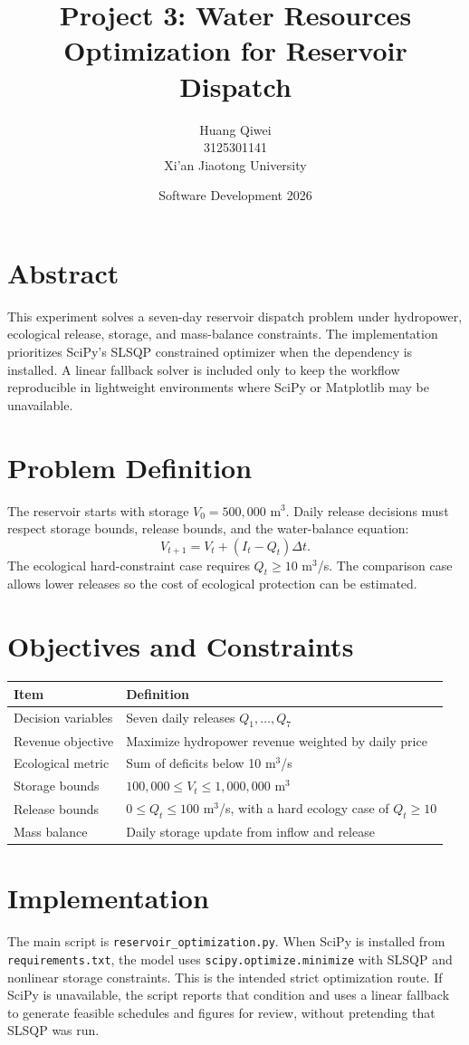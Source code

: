 \documentclass[11pt]{article}
\title{Project 3: Water Resources Optimization for Reservoir Dispatch}
\author{Huang Qiwei \\ 3125301141 \\ Xi'an Jiaotong University}
\date{Software Development 2026}
\begin{document}
\maketitle

\section*{Abstract}
This experiment solves a seven-day reservoir dispatch problem under hydropower, ecological release, storage, and mass-balance constraints. The implementation prioritizes SciPy's SLSQP constrained optimizer when the dependency is installed. A linear fallback solver is included only to keep the workflow reproducible in lightweight environments where SciPy or Matplotlib may be unavailable.

\section*{Problem Definition}
The reservoir starts with storage $V_0=500{,}000$ m$^3$. Daily release decisions must respect storage bounds, release bounds, and the water-balance equation:
\[
V_{t+1}=V_t+(I_t-Q_t)\Delta t.
\]
The ecological hard-constraint case requires $Q_t \ge 10$ m$^3$/s. The comparison case allows lower releases so the cost of ecological protection can be estimated.

\section*{Objectives and Constraints}
\begin{longtable}{ll}
\toprule
Item & Definition \\
\midrule
Decision variables & Seven daily releases $Q_1,\ldots,Q_7$ \\
Revenue objective & Maximize hydropower revenue weighted by daily price \\
Ecological metric & Sum of deficits below 10 m$^3$/s \\
Storage bounds & $100{,}000 \le V_t \le 1{,}000{,}000$ m$^3$ \\
Release bounds & $0 \le Q_t \le 100$ m$^3$/s, with a hard ecology case of $Q_t \ge 10$ \\
Mass balance & Daily storage update from inflow and release \\
\bottomrule
\end{longtable}

\section*{Implementation}
The main script is \texttt{reservoir\_optimization.py}. When SciPy is installed from \texttt{requirements.txt}, the model uses \texttt{scipy.optimize.minimize} with SLSQP and nonlinear storage constraints. This is the intended strict optimization route. If SciPy is unavailable, the script reports that condition and uses a linear fallback to generate feasible schedules and figures for review, without pretending that SLSQP was run.
\end{document}

